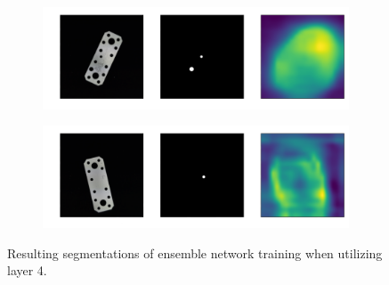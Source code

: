 

\begin{figure}[htbp]
    \centering
    \begin{subfigure}[b]{0.4\textwidth}
        \includegraphics[width=\textwidth]{figures/faillayer34/flat_connector_test_logical_anomalies_001.png}

    \end{subfigure}
    \begin{subfigure}[b]{0.4\textwidth}
        \includegraphics[width=\textwidth]{figures/faillayer34/flat_connector_test_logical_anomalies_023.png}

    \end{subfigure}
    \caption{Resulting segmentations of ensemble network training when utilizing layer 4.}
    \label{fig:faillayersegments}
\end{figure}